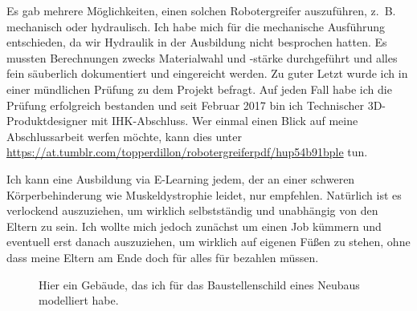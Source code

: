 \documentclass[fontsize=14pt,a4paper,headinclude,DIV=calc,automark]{scrbook}
\begin{document}
Es gab mehrere Möglichkeiten, einen solchen Robotergreifer auszuführen, z.~B. mechanisch oder hydraulisch. Ich habe mich für die mechanische Ausführung entschieden, da wir Hydraulik in der Ausbildung nicht besprochen hatten. Es mussten Berechnungen zwecks Materialwahl und -stärke durchgeführt und alles fein säuberlich dokumentiert und eingereicht werden. Zu guter Letzt wurde ich in einer mündlichen Prüfung zu dem Projekt befragt. Auf jeden Fall habe ich die Prüfung erfolgreich bestanden und seit Februar 2017 bin ich Technischer 3D-Produktdesigner mit IHK-Abschluss. Wer einmal einen Blick auf meine Abschlussarbeit werfen möchte, kann dies unter \url{https://at.tumblr.com/topperdillon/robotergreiferpdf/hup54b91bple} tun.

Ich kann eine Ausbildung via E-Learning jedem, der an einer schweren Körperbehinderung wie Muskeldystrophie leidet, nur empfehlen. Natürlich ist es verlockend auszuziehen, um wirklich selbstständig und unabhängig von den Eltern zu sein. Ich wollte mich jedoch zunächst um einen Job kümmern und eventuell erst danach auszuziehen, um wirklich auf eigenen Füßen zu stehen, ohne dass meine Eltern am Ende doch für alles für bezahlen müssen.

\setlength{\fboxsep}{0pt}    %
\setlength{\fboxrule}{0.2pt} %
\begin{figure}[H]
    \raggedright
    \caption{Hier ein Gebäude, das ich für das Baustellenschild eines Neubaus modelliert habe.}
    \label{fig:evangelisches_pfarrzentrum}
\end{figure}
\end{document}
